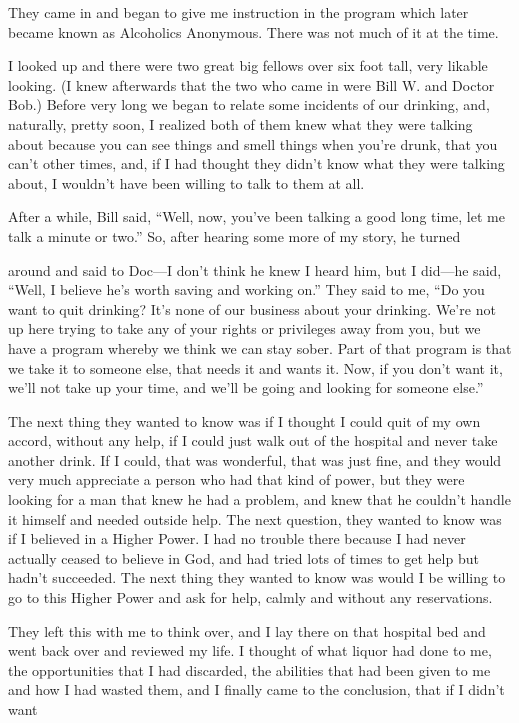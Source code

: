 \begin{biblechapter}
They came in and began to give me instruction in the program which later became known as Alcoholics Anonymous. There was not much of it at the time.

I looked up and there were two great big fellows over six foot tall, very likable looking. (I knew afterwards that the two who came in were Bill W. and Doctor Bob.) Before very long we began to relate some incidents of our drinking, and, naturally, pretty soon, I realized both of them knew what they were talking about because you can see things and smell things when you’re drunk, that you can’t other times, and, if I had thought they didn’t know what they were talking about, I wouldn’t have been willing to talk to them at all.

After a while, Bill said, “Well, now, you’ve been talking a good long time, let me talk a minute or two.” So, after hearing some more of my story, he turned

around and said to Doc—I don’t think he knew I heard him, but I did—he said, “Well, I believe he’s worth saving and working on.” They said to me, “Do you want to quit drinking? It’s none of our business about your drinking. We’re not up here trying to take any of your rights or privileges away from you, but we have a program whereby we think we can stay sober. Part of that program is that we take it to someone else, that needs it and wants it. Now, if you don’t want it, we’ll not take up your time, and we’ll be going and looking for someone else.”

The next thing they wanted to know was if I thought I could quit of my own accord, without any help, if I could just walk out of the hospital and never take another drink. If I could, that was wonderful, that was just fine, and they would very much appreciate a person who had that kind of power, but they were looking for a man that knew he had a problem, and knew that he couldn’t handle it himself and needed outside help. The next question, they wanted to know was if I believed in a Higher Power. I had no trouble there because I had never actually ceased to believe in God, and had tried lots of times to get help but hadn’t succeeded. The next thing they wanted to know was would I be willing to go to this Higher Power and ask for help, calmly and without any reservations.

They left this with me to think over, and I lay there on that hospital bed and went back over and reviewed my life. I thought of what liquor had done to me, the opportunities that I had discarded, the abilities that had been given to me and how I had wasted them, and I finally came to the conclusion, that if I didn’t want


\end{biblechapter}
